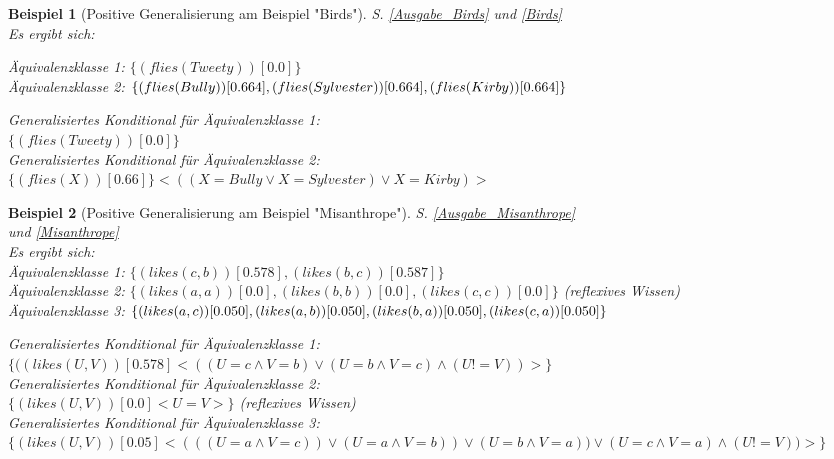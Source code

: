 \documentclass[a4paper, 11pt]{book}
\newtheorem{Bsp}{Beispiel}[section]
\begin{document}
\begin{Bsp}[Positive Generalisierung am Beispiel "{}Birds"{}] 
	S. \ref{Ausgabe_Birds} und \ref{Birds}\\
	Es ergibt sich:
	
	\noindent
	Äquivalenzklasse 1: $\{(flies(Tweety))[0.0]\}$\\
	Äquivalenzklasse 2: $\{(flies(Bully))[0.664], (flies(Sylvester))[0.664],\\ (flies(Kirby))[0.664]\}$
	
	
	\noindent
	Generalisiertes Konditional für Äquivalenzklasse 1:\\ $\{(flies(Tweety))[0.0]\}$\\
	Generalisiertes Konditional für Äquivalenzklasse 2: \\$\{(flies(X))[0.66]\} <((X=Bully \lor X=Sylvester) \lor X=Kirby)>$
\end{Bsp}
\begin{Bsp}[Positive Generalisierung am Beispiel "{}Misanthrope"{}] 
	S. \ref{Ausgabe_Misanthrope} \\ und \ref{Misanthrope}
	\\
	Es ergibt sich:\\
	
	\noindent
	Äquivalenzklasse 1: $ \{(likes(c,b))[0.578], (likes(b,c))[0.587]\} $\\
	Äquivalenzklasse 2: $ \{(likes(a,a))[0.0], (likes(b,b))[0.0], (likes(c,c))[0.0]\} $ (reflexives Wissen)\\
	Äquivalenzklasse 3: $ \{(likes(a,c))[0.050], (likes(a,b))[0.050], (likes(b,a))[0.050], \\ (likes(c,a))[0.050]\} $

	\noindent
	Generalisiertes Konditional für Äquivalenzklasse 1:\\ $ \{((likes(U,V))[0.578] <((U=c \land V=b) \lor (U=b \land V=c) \land (U!=V))>\} $\\
	Generalisiertes Konditional für Äquivalenzklasse 2:\\ $ \{(likes(U,V))[0.0] <U=V>\} $ (reflexives Wissen)\\
	Generalisiertes Konditional für Äquivalenzklasse 3:\\ $ \{(likes(U,V))[0.05] <((( U=a \land V=c)) \lor (U=a \land V=b)) \lor (U=b \land V=a)) \lor (U=c \land V=a) \land (U!=V))>\} $\\
\end{Bsp}
\end{document}

